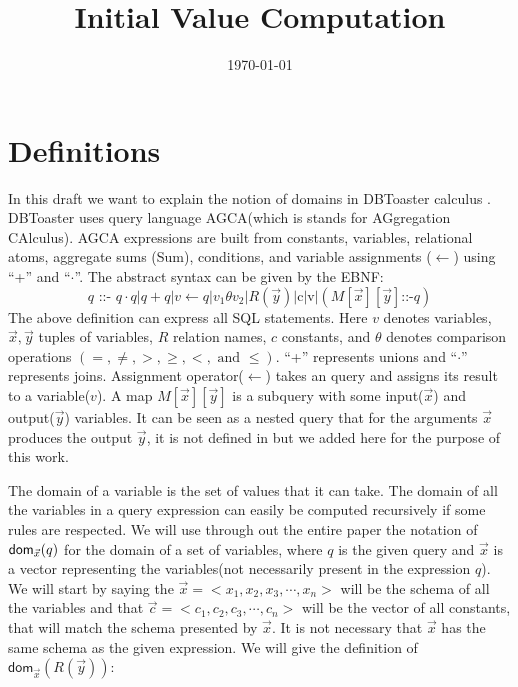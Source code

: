 \documentclass[12pt]{article}
\begin{document}
\title{Initial Value Computation}
\author{}
\date{\today}
\maketitle
\newcommand{\dom}{\textsf{dom}}

\section{Definitions}
In this draft we want to explain the notion of domains in DBToaster calculus \cite{1}. DBToaster uses query language AGCA(which is stands for AGgregation CAlculus). 
AGCA expressions are built from constants, variables, relational atoms, aggregate sums (Sum), conditions, and variable assignments ($\gets$) using ``+''  and ``$\cdot$''. The abstract syntax can be given by the EBNF:
\begin{equation}
\label{def:agca}
q\text{ ::- }q\cdot q | q + q|v \gets q |v_{1}\theta v_{2}|R(\vec{y})|\text{c}|\text{v}|(M[\vec{x}][\vec{y}]\text{::-}q)
\end{equation}
The above definition can express all SQL statements. Here $v$ denotes variables, $\vec{x},\vec{y}$ tuples of variables, $R$ relation names, $c$ constants, and $\theta$ denotes comparison operations $(=,\neq, >, \geq, <, \text{ and }\leq)$.
 ``+'' represents unions and ``$\cdot$'' represents joins. Assignment operator($\gets$) takes an query and assigns its result to a variable($v$). A map $M[\vec{x}][\vec{y}]$ is a subquery with some input($\vec{x}$) and output($\vec{y}$) variables. It can be seen as a nested query that for the arguments $\vec{x}$ produces the output $\vec{y}$, it is not defined in \cite{1} but we added here for the purpose of this work.

The domain of a variable is the set of values that it can take. The domain of all the variables in a query expression can easily be computed recursively if some rules are respected. We will use through out the entire paper the notation of $\text{\dom{}}_{\vec x}(q)$ for the domain of a set of variables, where $q$ is the given query and $\vec x$ is a vector representing the variables(not necessarily present in the expression $q$). We will start by saying the $\vec x=<x_1,x_2,x_3,\cdots,x_n>$ will be the schema of all the variables and that $\vec c=<c_1,c_2,c_3,\cdots,c_n>$ will be the vector of all constants, that will match the schema presented by $\vec x$. It is not necessary that $\vec{x}$  has the same schema as the given expression. We will give the definition of $\dom{}_{\vec x}(R(\vec y))$:
\end{document}

